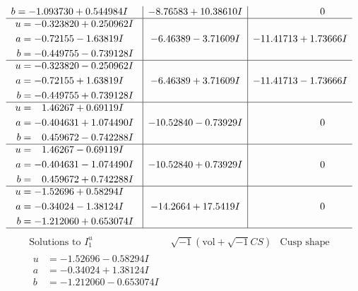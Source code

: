 \documentclass[1p]{elsarticle_modified}
\theoremstyle{definition}
\newcommand{\I}{\sqrt{-1}}
\begin{document}
$$\begin{array}{c|c|c}
\begin{aligned}
b &= -1.093730 + 0.544984 I\end{aligned}
 & -8.76583 + 10.38610 I & \phantom{-0.000000 } 0 \\ \hline\begin{aligned}
u &= -0.323820 + 0.250962 I \\
a &= -0.72155 - 1.63819 I \\
b &= -0.449755 - 0.739128 I\end{aligned}
 & -6.46389 - 3.71609 I & -11.41713 + 1.73666 I \\ \hline\begin{aligned}
u &= -0.323820 - 0.250962 I \\
a &= -0.72155 + 1.63819 I \\
b &= -0.449755 + 0.739128 I\end{aligned}
 & -6.46389 + 3.71609 I & -11.41713 - 1.73666 I \\ \hline\begin{aligned}
u &= \phantom{-}1.46267 + 0.69119 I \\
a &= -0.404631 + 1.074490 I \\
b &= \phantom{-}0.459672 - 0.742288 I\end{aligned}
 & -10.52840 - 0.73929 I & \phantom{-0.000000 } 0 \\ \hline\begin{aligned}
u &= \phantom{-}1.46267 - 0.69119 I \\
a &= -0.404631 - 1.074490 I \\
b &= \phantom{-}0.459672 + 0.742288 I\end{aligned}
 & -10.52840 + 0.73929 I & \phantom{-0.000000 } 0 \\ \hline\begin{aligned}
u &= -1.52696 + 0.58294 I \\
a &= -0.34024 - 1.38124 I \\
b &= -1.212060 + 0.653074 I\end{aligned}
 & -14.2664 + 17.5419 I & \phantom{-0.000000 } 0\\
 \hline 
 \end{array}$$\newpage$$\begin{array}{c|c|c}  
\text{Solutions to }I^u_{1}& \I (\text{vol} + \sqrt{-1}CS) & \text{Cusp shape}\\
 \hline 
\begin{aligned}
u &= -1.52696 - 0.58294 I \\
a &= -0.34024 + 1.38124 I \\
b &= -1.212060 - 0.653074 I\end{aligned}

\end{array}$$
\end{document}
